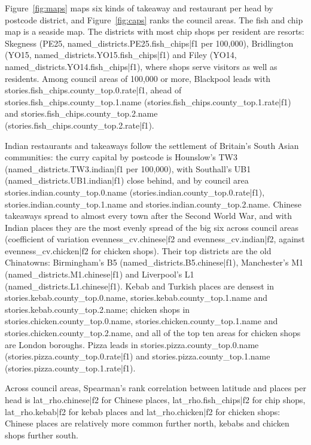 \documentclass[11pt,a4paper]{article}
\begin{document}
Figure~\ref{fig:maps} maps six kinds of takeaway and restaurant per head by postcode district, and Figure~\ref{fig:caps} ranks the council areas. The fish and chip map is a seaside map. The districts with most chip shops per resident are resorts: Skegness (PE25, {{named_districts.PE25.fish_chips|f1}} per 100,000), Bridlington (YO15, {{named_districts.YO15.fish_chips|f1}}) and Filey (YO14, {{named_districts.YO14.fish_chips|f1}}), where shops serve visitors as well as residents. Among council areas of 100,000 or more, Blackpool leads with {{stories.fish_chips.county_top.0.rate|f1}}, ahead of {{stories.fish_chips.county_top.1.name}} ({{stories.fish_chips.county_top.1.rate|f1}}) and {{stories.fish_chips.county_top.2.name}} ({{stories.fish_chips.county_top.2.rate|f1}}).

Indian restaurants and takeaways follow the settlement of Britain's South Asian communities: the curry capital by postcode is Hounslow's TW3 ({{named_districts.TW3.indian|f1}} per 100,000), with Southall's UB1 ({{named_districts.UB1.indian|f1}}) close behind, and by council area {{stories.indian.county_top.0.name}} ({{stories.indian.county_top.0.rate|f1}}), {{stories.indian.county_top.1.name}} and {{stories.indian.county_top.2.name}}. Chinese takeaways spread to almost every town after the Second World War, and with Indian places they are the most evenly spread of the big six across council areas (coefficient of variation {{evenness_cv.chinese|f2}} and {{evenness_cv.indian|f2}}, against {{evenness_cv.chicken|f2}} for chicken shops). Their top districts are the old Chinatowns: Birmingham's B5 ({{named_districts.B5.chinese|f1}}), Manchester's M1 ({{named_districts.M1.chinese|f1}}) and Liverpool's L1 ({{named_districts.L1.chinese|f1}}). Kebab and Turkish places are densest in {{stories.kebab.county_top.0.name}}, {{stories.kebab.county_top.1.name}} and {{stories.kebab.county_top.2.name}}; chicken shops in {{stories.chicken.county_top.0.name}}, {{stories.chicken.county_top.1.name}} and {{stories.chicken.county_top.2.name}}, and all of the top ten areas for chicken shops are London boroughs. Pizza leads in {{stories.pizza.county_top.0.name}} ({{stories.pizza.county_top.0.rate|f1}}) and {{stories.pizza.county_top.1.name}} ({{stories.pizza.county_top.1.rate|f1}}).

Across council areas, Spearman's rank correlation between latitude and places per head is {{lat_rho.chinese|f2}} for Chinese places, {{lat_rho.fish_chips|f2}} for chip shops, {{lat_rho.kebab|f2}} for kebab places and {{lat_rho.chicken|f2}} for chicken shops: Chinese places are relatively more common further north, kebabs and chicken shops further south.
\end{document}
